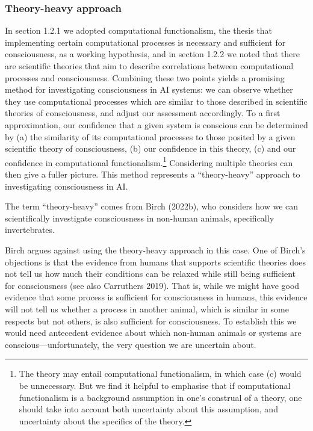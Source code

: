 \documentclass[12pt]{article}
\begin{document}
\begin{infobox} 
\end{infobox}

\subsubsection{Theory-heavy approach}

In section 1.2.1 we adopted computational functionalism, the thesis that implementing certain computational processes is necessary and sufficient for consciousness, as a working hypothesis, and in section 1.2.2 we noted that there are scientific theories that aim to describe correlations between computational processes and consciousness. Combining these two points yields a promising method for investigating consciousness in AI systems: we can observe whether they use computational processes which are similar to those described in scientific theories of consciousness, and adjust our assessment accordingly. To a first approximation, our confidence that a given system is conscious can be determined by (a) the similarity of its computational processes to those posited by a given scientific theory of consciousness, (b) our confidence in this theory, (c) and our confidence in computational functionalism.\footnote{The theory may entail computational functionalism, in which case (c) would be unnecessary. But we find it helpful to emphasise that if computational functionalism is a background assumption in one’s construal of a theory, one should take into account both uncertainty about this assumption, and uncertainty about the specifics of the theory.} Considering multiple theories can then give a fuller picture. This method represents a ``theory-heavy'' approach to investigating consciousness in AI.

The term ``theory-heavy'' comes from Birch (2022b), who considers how we can  scientifically investigate consciousness in non-human animals, specifically invertebrates.

Birch argues against using the theory-heavy approach in this case. One of Birch’s objections is that the evidence from humans that supports scientific theories does not tell us how much their conditions can be relaxed while still being sufficient for consciousness (see also Carruthers 2019). That is, while we might have good evidence that some process is sufficient for consciousness in humans, this evidence will not tell us whether a process in another animal, which is similar in some respects but not others, is also sufficient for consciousness. To establish this we would need antecedent evidence about which non-human animals or systems are conscious—unfortunately, the very question we are uncertain about.
\end{document}
